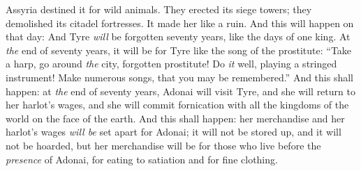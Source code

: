 \begin{biblechapter}
{Assyria destined} it for wild animals. 
They erected its siege towers; 
they demolished its citadel fortresses. 
It made her like a ruin.
\verse And this will happen on that day: And Tyre \textit{will} be forgotten seventy years, like the days of one king. At \textit{the} end of seventy years, it will be for Tyre like the song of the prostitute:
\verse “Take a harp, 
go around \textit{the} city, forgotten prostitute! 
Do \textit{it} well, playing a stringed instrument! 
Make numerous songs, that you may be remembered.”
\verse And this shall happen: at \textit{the} end of seventy years, Adonai will visit Tyre, and she will return to her harlot’s wages, 
and she will commit fornication 
with all the kingdoms of the world on the face of the earth.
\verse And this shall happen: her merchandise and her harlot’s wages \textit{will be} set apart for Adonai; it will not be stored up, 
and it will not be hoarded, 
but her merchandise will be for those who live before the \textit{presence} of Adonai, 
for eating to satiation and for fine clothing.
\end{biblechapter}

